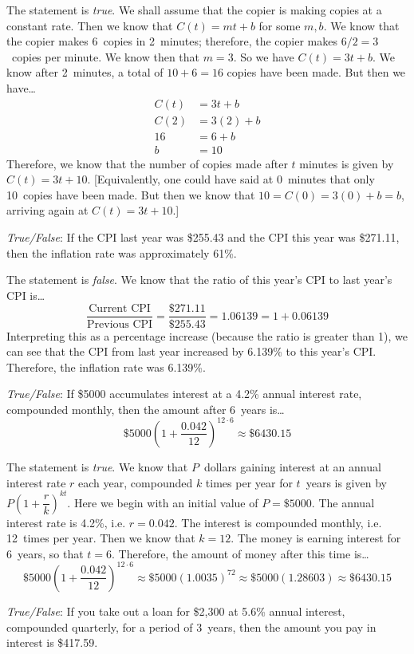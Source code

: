 \documentclass[11pt,letterpaper]{article}
\begin{document}
\sol The statement is \textit{true}. We shall assume that the copier is making copies at a constant rate. Then we know that $C(t)= mt + b$ for some $m, b$. We know that the copier makes 6~copies in 2~minutes; therefore, the copier makes $6/2= 3$~copies per minute. We know then that $m= 3$. So we have $C(t)= 3t + b$. We know after 2~minutes, a total of $10 + 6= 16$ copies have been made. But then we have\dots
	\[
	\begin{aligned}
	C(t)&= 3t + b \\[0.3cm]
	C(2)&= 3(2) + b \\[0.3cm]
	16&= 6 + b \\[0.3cm]
	b&= 10
	\end{aligned}
	\]
Therefore, we know that the number of copies made after $t$ minutes is given by $C(t)= 3t + 10$. [Equivalently, one could have said at 0~minutes that only 10~copies have been made. But then we know that $10= C(0)= 3(0) + b= b$, arriving again at $C(t)= 3t + 10$.] \pvspace{1.5cm}



\quizsol \textit{True/False}: If the CPI last year was \$255.43 and the CPI this year was \$271.11, then the inflation rate was approximately 61\%. \pspace

\sol The statement is \textit{false}. We know that the ratio of this year's CPI to last year's CPI is\dots
	\[
	\dfrac{\text{Current CPI}}{\text{Previous CPI}}= \dfrac{\$271.11}{\$255.43}= 1.06139= 1 + 0.06139
	\]
Interpreting this as a percentage increase (because the ratio is greater than 1), we can see that the CPI from last year increased by 6.139\% to this year's CPI. Therefore, the inflation rate was 6.139\%. \pvspace{1.5cm}



\quizsol \textit{True/False}: If \$5000 accumulates interest at a 4.2\% annual interest rate, compounded monthly, then the amount after 6~years is\dots
	\[
	\$5000 \left(1 + \dfrac{0.042}{12} \right)^{12 \cdot 6} \approx \$6430.15
	\] \pspace



\newpage



\sol The statement is \textit{true}. We know that $P$~dollars gaining interest at an annual interest rate $r$ each year, compounded $k$ times per year for $t$~years is given by $P \left(1 + \dfrac{r}{k} \right)^{kt}$. Here we begin with an initial value of $P= \$5000$. The annual interest rate is 4.2\%, i.e. $r= 0.042$. The interest is compounded monthly, i.e. 12~times per year. Then we know that $k= 12$. The money is earning interest for 6~years, so that $t= 6$. Therefore, the amount of money after this time is\dots
	\[
	\$5000 \left(1 + \dfrac{0.042}{12} \right)^{12 \cdot 6} \approx \$5000 (1.0035)^{72} \approx \$5000(1.28603) \approx \$6430.15
	\]



\quizsol \textit{True/False}: If you take out a loan for \$2,300 at 5.6\% annual interest, compounded quarterly, for a period of 3~years, then the amount you pay in interest is \$417.59. \pspace

\sol 
\end{document}
